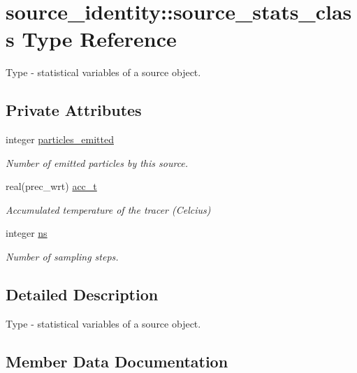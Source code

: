 \hypertarget{structsource__identity_1_1source__stats__class}{}\section{source\+\_\+identity\+:\+:source\+\_\+stats\+\_\+class Type Reference}
\label{structsource__identity_1_1source__stats__class}


Type -\/ statistical variables of a source object.  


\subsection*{Private Attributes}
\begin{DoxyCompactItemize}
\item 
integer \mbox{\hyperlink{structsource__identity_1_1source__stats__class_a56ec334a178feedfc7ad55a1369fc89a}{particles\+\_\+emitted}}
\begin{DoxyCompactList}\small\item\em Number of emitted particles by this source. \end{DoxyCompactList}\item 
real(prec\+\_\+wrt) \mbox{\hyperlink{structsource__identity_1_1source__stats__class_aa5e66f9ef6c5061a25fba1c2895ee6db}{acc\+\_\+t}}
\begin{DoxyCompactList}\small\item\em Accumulated temperature of the tracer (Celcius) \end{DoxyCompactList}\item 
integer \mbox{\hyperlink{structsource__identity_1_1source__stats__class_a978883318dd2750f36ad1d6fe367dc46}{ns}}
\begin{DoxyCompactList}\small\item\em Number of sampling steps. \end{DoxyCompactList}\end{DoxyCompactItemize}


\subsection{Detailed Description}
Type -\/ statistical variables of a source object. 

\subsection{Member Data Documentation}
\mbox{\label{structsource__identity_1_1source__stats__class_aa5e66f9ef6c5061a25fba1c2895ee6db}} 

